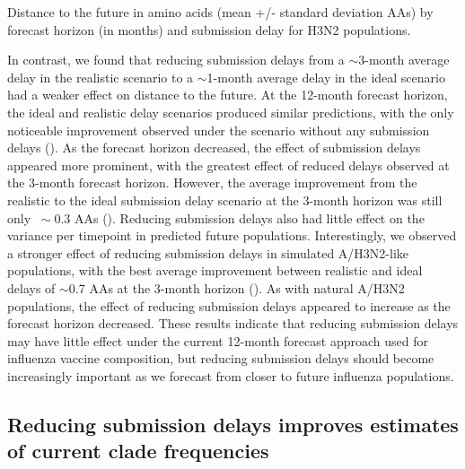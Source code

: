 \documentclass[9pt,lineno]{elife}
\begin{document}
\begin{table}[htb]
  \begin{center}
    
    \caption{Distance to the future in amino acids (mean +/- standard deviation AAs) by forecast horizon (in months) and submission delay for H3N2 populations.}
    \label{tab:h3n2_distances_to_the_future}
  \end{center}
\end{table}

In contrast, we found that reducing submission delays from a $\sim$3-month average delay in the realistic scenario to a $\sim$1-month average delay in the ideal scenario had a weaker effect on distance to the future.
At the 12-month forecast horizon, the ideal and realistic delay scenarios produced similar predictions, with the only noticeable improvement observed under the scenario without any submission delays ().
As the forecast horizon decreased, the effect of submission delays appeared more prominent, with the greatest effect of reduced delays observed at the 3-month forecast horizon.
However, the average improvement from the realistic to the ideal submission delay scenario at the 3-month horizon was still only $~\sim$0.3 AAs ().
Reducing submission delays also had little effect on the variance per timepoint in predicted future populations.
Interestingly, we observed a stronger effect of reducing submission delays in simulated A/H3N2-like populations, with the best average improvement between realistic and ideal delays of $\sim$0.7 AAs at the 3-month horizon ().
As with natural A/H3N2 populations, the effect of reducing submission delays appeared to increase as the forecast horizon decreased.
These results indicate that reducing submission delays may have little effect under the current 12-month forecast approach used for influenza vaccine composition, but reducing submission delays should become increasingly important as we forecast from closer to future influenza populations.

\subsection{Reducing submission delays improves estimates of current clade frequencies}
\end{document}

